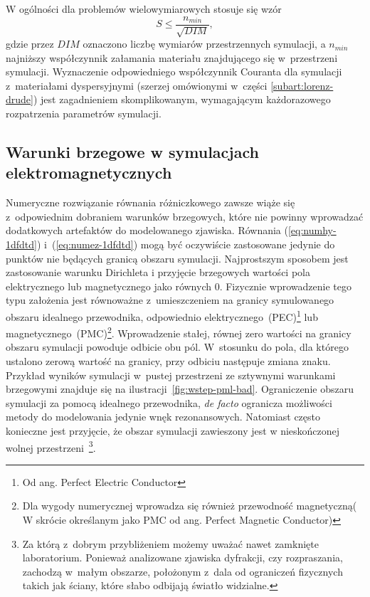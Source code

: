 W ogólności dla problemów wielowymiarowych stosuje się wzór
\begin{equation}
S\le\frac{n_{min}}{\sqrt{DIM}},
\label{eq:courant}
\end{equation}
gdzie przez $DIM$ oznaczono liczbę wymiarów przestrzennych symulacji, a $n_{min}$ najniższy współczynnik załamania materiału znajdującego się w~przestrzeni symulacji. Wyznaczenie odpowiedniego współczynnik Couranta dla symulacji z~materiałami dyspersyjnymi (szerzej omówionymi w~części \ref{subart:lorenz-drude}) jest zagadnieniem skomplikowanym, wymagającym każdorazowego rozpatrzenia parametrów symulacji.

\subsection{Warunki brzegowe w symulacjach elektromagnetycznych}
 Numeryczne rozwiązanie równania różniczkowego zawsze wiąże się z~odpowiednim dobraniem warunków brzegowych, które nie powinny wprowadzać dodatkowych artefaktów do modelowanego zjawiska. Równania (\ref{eq:numhy-1dfdtd}) i~(\ref{eq:numez-1dfdtd}) mogą być oczywiście zastosowane jedynie do punktów nie będących granicą obszaru symulacji. Najprostszym sposobem jest zastosowanie warunku Dirichleta i przyjęcie brzegowych wartości pola elektrycznego lub magnetycznego jako równych 0. Fizycznie wprowadzenie tego typu założenia jest równoważne z~umieszczeniem na granicy symulowanego obszaru idealnego przewodnika, odpowiednio elektrycznego~(PEC)\footnote{Od ang. Perfect Electric Conductor} lub magnetycznego~(PMC)\footnote{Dla wygody numerycznej wprowadza się również przewodność magnetyczną( W skrócie określanym jako PMC od ang. Perfect Magnetic Conductor)}. Wprowadzenie stałej, równej zero wartości na granicy obszaru symulacji powoduje odbicie obu pól. W~stosunku do pola, dla którego ustalono zerową wartość na granicy, przy odbiciu następuje zmiana znaku. Przykład wyników symulacji w~pustej przestrzeni ze sztywnymi warunkami brzegowymi znajduje się na ilustracji~\ref{fig:wstep-pml-bad}. Ograniczenie obszaru symulacji za pomocą idealnego przewodnika, \textit{de facto} ogranicza możliwości metody do modelowania jedynie wnęk rezonansowych. Natomiast często konieczne jest przyjęcie, że obszar symulacji zawieszony jest w nieskończonej wolnej przestrzeni~\footnote{Za którą z~dobrym przybliżeniem możemy uważać nawet zamknięte laboratorium. Ponieważ analizowane zjawiska dyfrakcji, czy rozpraszania, zachodzą w~małym obszarze, położonym z~dala od ograniczeń fizycznych takich jak ściany, które słabo odbijają światło widzialne.}.

